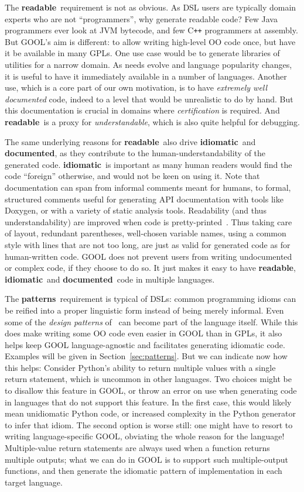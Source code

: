 \documentclass[sigplan,review,anonymous,prologue,dvipsnames]{acmart}
\newcommand{\Cplusplus}{C\texttt{++}}
\newcommand{\abbrev}[1]{\textbf{#1}}
\newcommand{\readable}{\abbrev{readable}}
\newcommand{\idiomatic}{\abbrev{idiomatic}}
\newcommand{\documented}{\abbrev{documented}}
\newcommand{\oopatterns}{\abbrev{patterns}}
\begin{document}
The \readable~requirement is not as obvious. As DSL users are typically
domain experts who are not ``programmers'', why generate readable code?
Few Java programmers ever look at JVM bytecode, and few \Cplusplus{} programmers
at assembly. But GOOL's aim is different: to allow writing
high-level OO code once, but have it be available in many GPLs. One use case
would be to generate libraries of utilities for a narrow domain. As needs
evolve and language popularity changes, it is useful to have it immediately
available in a number of languages. Another use, which is a core part of our
own motivation, is to have \emph{extremely well documented} code, indeed to
a level that would be unrealistic to do by hand. But this documentation is
crucial in domains where \emph{certification} is required.  And
\readable~is a proxy for \emph{understandable}, which is also quite
helpful for debugging.

The same underlying reasons for \readable~also drive \idiomatic~and \documented,
as they contribute to the human-understandability of the generated code.
\idiomatic~is important as many human readers would find the code ``foreign''
otherwise, and would not be keen on using it.
Note that documentation can span from informal comments meant for humans, to
formal, structured comments useful for generating API documentation with tools
like Doxygen, or with a variety of static analysis tools.
Readability (and thus understandability) are improved when code is 
pretty-printed~\cite{buse2009learning}. Thus taking care of layout, redundant parentheses,
well-chosen variable names, using a common style with lines that are not too
long, are just as valid for generated code as for human-written code.
GOOL does not prevent users from writing undocumented or complex code, if they
choose to do so. It just makes it easy to have \readable, \idiomatic~and
\documented~code in multiple languages.

The \oopatterns~requirement is typical of DSLs: common programming idioms
can be reified into a proper linguistic form instead of being merely
informal. Even some of the \emph{design patterns} of~\cite{gamma1995design}
can become part of the language itself. While this does make writing some OO
code even easier in GOOL than in GPLs, it also helps
keep GOOL language-agnostic and facilitates generating idiomatic code.
Examples will be given in Section~\ref{sec:patterns}.  But we can
indicate now how this helps: Consider Python's
ability to return multiple values with a single return statement, which
is uncommon in other languages.  Two choices might be to disallow this
feature in GOOL, or throw an error on use when generating code in languages
that do not support this feature. In the first case, this would likely mean
unidiomatic Python code, or increased complexity in the Python generator to
infer that idiom. The second option is worse still: one might have to resort
to writing language-specific GOOL, obviating the whole reason for the language!
Multiple-value return statements are always used when a function returns multiple
outputs; what we can do in GOOL is to support such multiple-output functions,
and then generate the idiomatic pattern of implementation in each target
language.
\end{document}
